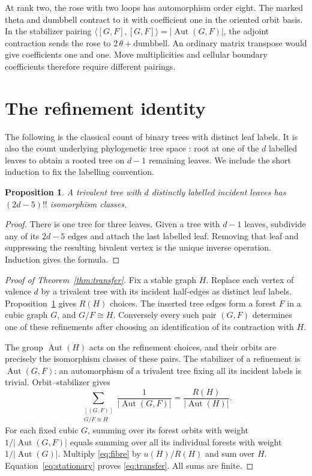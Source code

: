 \documentclass[11pt]{article}
\newtheorem{proposition}[theorem]{Proposition}
\theoremstyle{definition}
\newcommand{\Aut}{\operatorname{Aut}}
\numberwithin{equation}{section}
\begin{document}
At rank two, the rose with two loops has automorphism order eight.
The marked theta and dumbbell contract to it with coefficient one
in the oriented orbit basis. In the stabilizer pairing
$\langle [G,F],[G,F]\rangle=|\Aut(G,F)|$, the adjoint contraction sends
the rose to $2\,\theta+\mathrm{dumbbell}$. An ordinary matrix transpose
would give coefficients one and one. Move multiplicities and cellular
boundary coefficients therefore require different pairings.

\section{The refinement identity}

The following is the classical count of binary trees with distinct
leaf labels. It is also the count underlying phylogenetic tree space
\cite[Sections 1--2]{BHV}: root at one of the $d$ labelled leaves
to obtain a rooted tree on $d-1$ remaining leaves. We include the
short induction to fix the labelling convention.

\begin{proposition}\label{prop:trees}
A trivalent tree with $d$ distinctly labelled incident leaves has
$(2d-5)!!$ isomorphism classes.
\end{proposition}
\begin{proof}
There is one tree for three leaves. Given a tree with $d-1$ leaves,
subdivide any of its $2d-5$ edges and attach the last labelled leaf.
Removing that leaf and suppressing the resulting bivalent vertex is
the unique inverse operation. Induction gives the formula.
\end{proof}

\begin{proof}[Proof of Theorem~\ref{thm:transfer}]
Fix a stable graph $H$. Replace each vertex of valence $d$ by a
trivalent tree with its incident half-edges as distinct leaf labels.
Proposition~\ref{prop:trees} gives $R(H)$ choices. The inserted tree
edges form a forest $F$ in a cubic graph $G$, and $G/F\cong H$.
Conversely every such pair $(G,F)$ determines one of these refinements
after choosing an identification of its contraction with $H$.

The group $\Aut(H)$ acts on the refinement choices, and their orbits
are precisely the isomorphism classes of these pairs. The stabilizer
of a refinement is $\Aut(G,F)$: an automorphism of a trivalent tree
fixing all its incident labels is trivial. Orbit--stabilizer gives
\begin{equation}\label{eq:fibre}
 \sum_{\substack{[(G,F)]\\G/F\cong H}}\frac1{|\Aut(G,F)|}
              =\frac{R(H)}{|\Aut(H)|}.
\end{equation}
For each fixed cubic $G$, summing over its forest orbits with weight
$1/|\Aut(G,F)|$ equals summing over all its individual forests with
weight $1/|\Aut(G)|$. Multiply \eqref{eq:fibre} by $u(H)/R(H)$ and
sum over $H$. Equation~\eqref{eq:stationary} proves
\eqref{eq:transfer}. All sums are finite.
\end{proof}
\end{document}
